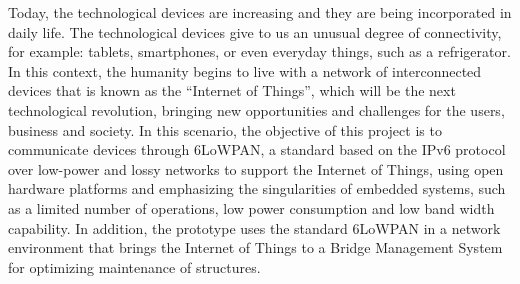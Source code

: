 
\vspace{0.5cm}

Today, the technological devices are increasing and they are being incorporated in daily life. The technological devices give to us an unusual degree of connectivity, for example: tablets, smartphones, or even everyday things, such as a refrigerator. In this context, the humanity begins to live with a network of interconnected devices that is known as the ``Internet of Things'', which will be the next technological revolution, bringing new opportunities and challenges for the users, business and society. In this scenario, the objective of this project is to communicate devices through 6LoWPAN, a standard based on the IPv6 protocol over low-power and lossy networks to support the Internet of Things, using open hardware platforms and emphasizing the singularities of embedded systems, such as a limited number of operations, low power consumption and low band width capability. In addition, the prototype uses the standard 6LoWPAN in a network environment that brings the Internet of Things to a Bridge Management System for optimizing maintenance of structures.\\


